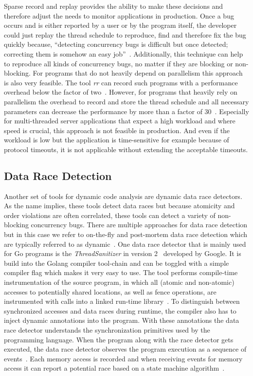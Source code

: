 \documentclass[english]{lni}
\begin{document}
Sparse record and replay provides the ability to make these decisions and therefore adjust the needs to monitor applications in production.
Once a bug occurs and is either reported by a user or by the program itself, the developer could just replay the thread schedule to reproduce, find and therefore fix the bug quickly because, ``detecting concurrency bugs is difficult but once detected; correcting them is somehow an easy job''~\cite{tchamgoue2012testing}.
Additionally, this technique can help to reproduce all kinds of concurrency bugs, no matter if they are blocking or non-blocking.
For programs that do not heavily depend on parallelism this approach is also very feasible.
The tool \emph{rr} can record such programs with a performance overhead below the factor of two~\cite{o2017engineering}.
However, for programs that heavily rely on parallelism the overhead to record and store the thread schedule and all necessary parameters can decrease the performance by more than a factor of 30~\cite{o2017engineering}.
Especially for multi-threaded server applications that expect a high workload and where speed is crucial, this approach is not feasible in production.
And even if the workload is low but the application is time-sensitive for example because of protocol timeouts, it is not applicable without extending the acceptable timeouts.

\subsection{Data Race Detection}
Another set of tools for dynamic code analysis are dynamic data race detectors.
As the name implies, these tools detect data races but because atomicity and order violations are often correlated, these tools can detect a variety of non-blocking concurrency bugs.
There are multiple approaches for data race detection but in this case we refer to on-the-fly and post-mortem data race detection which are typically referred to as dynamic~\cite{serebry2009threadsanitizer}.
One data race detector that is mainly used for Go programs is the \emph{ThreadSanitizer} in version 2~\cite{threadSanitizer} developed by Google.
It is build into the Golang compiler tool-chain and can be toggled with a simple compiler flag which makes it very easy to use.
The tool performs compile-time instrumentation of the source program, in which all (atomic and non-atomic) accesses to potentially shared locations, as well as fence operations, are instrumented with calls into a linked run-time library~\cite{lidbury2019sparse}.
To distinguish between synchronized accesses and data races during runtime, the compiler also has to inject dynamic annotations into the program.
With these annotations the data race detector understands the synchronization primitives used by the programming language.
When the program along with the race detector gets executed, the data race detector observes the program execution as a sequence of events~\cite{serebry2009threadsanitizer}.
Each memory access is recorded and when receiving events for memory access it can report a potential race based on a state machine algorithm~\cite{serebry2011llvm}.
\end{document}
